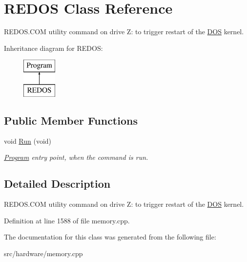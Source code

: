 \hypertarget{classREDOS}{\section{R\-E\-D\-O\-S Class Reference}
\label{classREDOS}
}


R\-E\-D\-O\-S.\-C\-O\-M utility command on drive Z\-: to trigger restart of the \hyperlink{classDOS}{D\-O\-S} kernel.  


Inheritance diagram for R\-E\-D\-O\-S\-:\begin{figure}[H]
\begin{center}
\leavevmode
\includegraphics[height=2.000000cm]{classREDOS}
\end{center}
\end{figure}
\subsection*{Public Member Functions}
\begin{DoxyCompactItemize}
\item 
\hypertarget{classREDOS_aa2d659599de1058d1b59069bfad7da76}{void \hyperlink{classREDOS_aa2d659599de1058d1b59069bfad7da76}{Run} (void)}\label{classREDOS_aa2d659599de1058d1b59069bfad7da76}

\begin{DoxyCompactList}\small\item\em \hyperlink{classProgram}{Program} entry point, when the command is run. \end{DoxyCompactList}\end{DoxyCompactItemize}


\subsection{Detailed Description}
R\-E\-D\-O\-S.\-C\-O\-M utility command on drive Z\-: to trigger restart of the \hyperlink{classDOS}{D\-O\-S} kernel. 

Definition at line 1588 of file memory.\-cpp.



The documentation for this class was generated from the following file\-:\begin{DoxyCompactItemize}
\item 
src/hardware/memory.\-cpp\end{DoxyCompactItemize}
